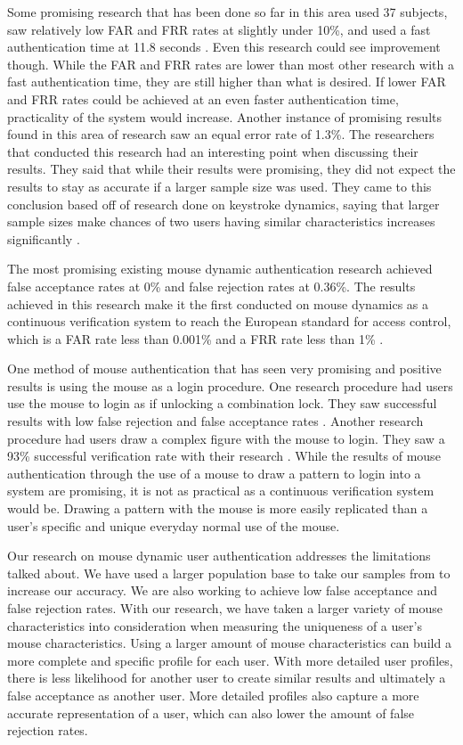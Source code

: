\documentclass[conference]{IEEEtran}
\begin{document}
Some promising research that has been done so far in this area used 37 subjects, saw relatively low FAR and FRR rates at slightly under 10\%, and used a fast authentication time at 11.8 seconds \cite{CS}. Even this research could see improvement though. While the FAR and FRR rates are lower than most other research with a fast authentication time, they are still higher than what is desired. If lower FAR and FRR rates could be achieved at an even faster authentication time, practicality of the system would increase. Another instance of promising results found in this area of research saw an equal error rate of 1.3\%. The researchers that conducted this research had an interesting point when discussing their results. They said that while their results were promising, they did not expect the results to stay as accurate if a larger sample size was used. They came to this conclusion based off of research done on keystroke dynamics, saying that larger sample sizes make chances of two users having similar characteristics increases significantly \cite{Zhe}.

The most promising existing mouse dynamic authentication research achieved false acceptance rates at 0\% and false rejection rates at 0.36\%. The results achieved in this research make it the first conducted on mouse dynamics as a continuous verification system to reach the European standard for access control, which is a FAR rate less than 0.001\% and a FRR rate less than 1\% \cite{Nak}.

One method of mouse authentication that has seen very promising and positive results is using the mouse as a login procedure. One research procedure had users use the mouse to login as if unlocking a combination lock. They saw successful results with low false rejection and false acceptance rates \cite{HJ}. Another research procedure had users draw a complex figure with the mouse to login. They saw a 93\% successful verification rate with their research \cite{Syu}. While the results of mouse authentication through the use of a mouse to draw a pattern to login into a system are promising, it is not as practical as a continuous verification system would be. Drawing a pattern with the mouse is more easily replicated than a user’s specific and unique everyday normal use of the mouse.   

Our research on mouse dynamic user authentication addresses the limitations talked about. We have used a larger population base to take our samples from to increase our accuracy. We are also working to achieve low false acceptance and false rejection rates. With our research, we have taken a larger variety of mouse characteristics into consideration when measuring the uniqueness of a user’s mouse characteristics. Using a larger amount of mouse characteristics can build a more complete and specific profile for each user. With more detailed user profiles, there is less likelihood for another user to create similar results and ultimately a false acceptance as another user. More detailed profiles also capture a more accurate representation of a user, which can also lower the amount of false rejection rates.
\end{document}
